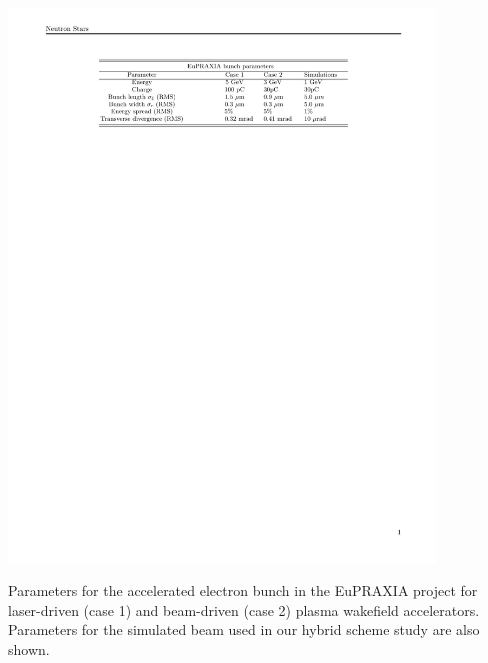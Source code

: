 \begin{table}[!ht]
\centering
\includegraphics[width=0.85\textwidth]{table_eupraxia.pdf}
\caption{\small{Parameters for the accelerated electron bunch in the EuPRAXIA project for laser-driven  (case 1) and beam-driven (case 2) plasma wakefield accelerators. Parameters for the simulated beam used in our hybrid scheme study are also shown.}}
\label{eupraxia_parameters}
\end{table}

